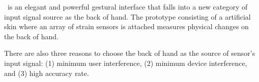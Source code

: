 \documentclass{sigchi}
\begin{document}








 
 

\getTitleName\ is an elegant and powerful gestural interface that falls into a new category of input signal source as the back of hand. The prototype consisting of a artificial skin where an array of strain sensors is attached measures physical changes on the back of hand.


There are also three reasons to choose the back of hand as the source of sensor's input signal: (1) minimum user interference, (2) minimum device interference, and (3) high accuracy rate. 
\end{document}
